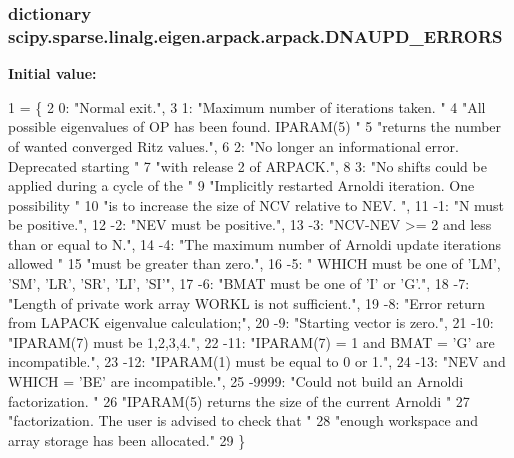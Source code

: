 \subsubsection[{D\+N\+A\+U\+P\+D\+\_\+\+E\+R\+R\+O\+R\+S}]{\setlength{\rightskip}{0pt plus 5cm}dictionary scipy.\+sparse.\+linalg.\+eigen.\+arpack.\+arpack.\+D\+N\+A\+U\+P\+D\+\_\+\+E\+R\+R\+O\+R\+S}\label{namespacescipy_1_1sparse_1_1linalg_1_1eigen_1_1arpack_1_1arpack_a987ca4aadd547b4ad858ee382218f7ab}
{\bfseries Initial value\+:}
\begin{DoxyCode}
1 = \{
2     0: \textcolor{stringliteral}{"Normal exit."},
3     1: \textcolor{stringliteral}{"Maximum number of iterations taken. "}
4        \textcolor{stringliteral}{"All possible eigenvalues of OP has been found. IPARAM(5) "}
5        \textcolor{stringliteral}{"returns the number of wanted converged Ritz values."},
6     2: \textcolor{stringliteral}{"No longer an informational error. Deprecated starting "}
7        \textcolor{stringliteral}{"with release 2 of ARPACK."},
8     3: \textcolor{stringliteral}{"No shifts could be applied during a cycle of the "}
9        \textcolor{stringliteral}{"Implicitly restarted Arnoldi iteration. One possibility "}
10        \textcolor{stringliteral}{"is to increase the size of NCV relative to NEV. "},
11     -1: \textcolor{stringliteral}{"N must be positive."},
12     -2: \textcolor{stringliteral}{"NEV must be positive."},
13     -3: \textcolor{stringliteral}{"NCV-NEV >= 2 and less than or equal to N."},
14     -4: \textcolor{stringliteral}{"The maximum number of Arnoldi update iterations allowed "}
15         \textcolor{stringliteral}{"must be greater than zero."},
16     -5: \textcolor{stringliteral}{" WHICH must be one of 'LM', 'SM', 'LR', 'SR', 'LI', 'SI'"},
17     -6: \textcolor{stringliteral}{"BMAT must be one of 'I' or 'G'."},
18     -7: \textcolor{stringliteral}{"Length of private work array WORKL is not sufficient."},
19     -8: \textcolor{stringliteral}{"Error return from LAPACK eigenvalue calculation;"},
20     -9: \textcolor{stringliteral}{"Starting vector is zero."},
21     -10: \textcolor{stringliteral}{"IPARAM(7) must be 1,2,3,4."},
22     -11: \textcolor{stringliteral}{"IPARAM(7) = 1 and BMAT = 'G' are incompatible."},
23     -12: \textcolor{stringliteral}{"IPARAM(1) must be equal to 0 or 1."},
24     -13: \textcolor{stringliteral}{"NEV and WHICH = 'BE' are incompatible."},
25     -9999: \textcolor{stringliteral}{"Could not build an Arnoldi factorization. "}
26            \textcolor{stringliteral}{"IPARAM(5) returns the size of the current Arnoldi "}
27            \textcolor{stringliteral}{"factorization. The user is advised to check that "}
28            \textcolor{stringliteral}{"enough workspace and array storage has been allocated."}
29 \}
\end{DoxyCode}
\hypertarget{namespacescipy_1_1sparse_1_1linalg_1_1eigen_1_1arpack_1_1arpack_acc370abd0cebb72befb5455f4bcdd6c0}{}
